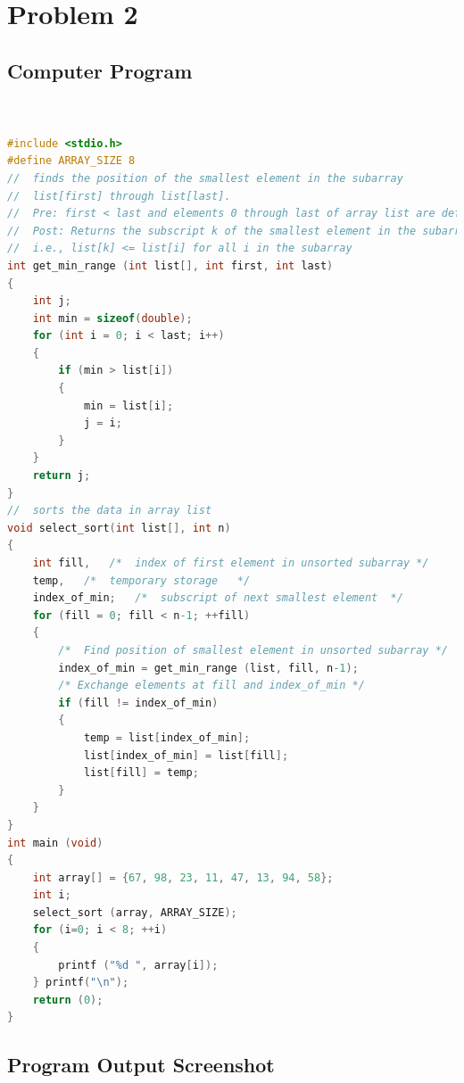 \section{{Problem 2}}
	
		\subsection{{Computer Program}}
	
			\begin{lstlisting}[language=C, caption=\textit{Program to calculate the Gross Pay of a series of workers}]	


#include <stdio.h>
#define ARRAY_SIZE 8
//  finds the position of the smallest element in the subarray
//  list[first] through list[last].
//  Pre: first < last and elements 0 through last of array list are defined.
//  Post: Returns the subscript k of the smallest element in the subarray;
//  i.e., list[k] <= list[i] for all i in the subarray
int get_min_range (int list[], int first, int last)
{
    int j;
    int min = sizeof(double);
    for (int i = 0; i < last; i++)
    {
        if (min > list[i])
        {
            min = list[i];
            j = i;
        }
    }
    return j;
}
//  sorts the data in array list
void select_sort(int list[], int n)
{
    int fill,   /*  index of first element in unsorted subarray */
    temp,   /*  temporary storage   */
    index_of_min;   /*  subscript of next smallest element  */
    for (fill = 0; fill < n-1; ++fill)
    {
        /*  Find position of smallest element in unsorted subarray */
        index_of_min = get_min_range (list, fill, n-1);
        /* Exchange elements at fill and index_of_min */
        if (fill != index_of_min)
        {
            temp = list[index_of_min];
            list[index_of_min] = list[fill];
            list[fill] = temp;
        }
    }
}
int main (void)
{
    int array[] = {67, 98, 23, 11, 47, 13, 94, 58};
    int i;
    select_sort (array, ARRAY_SIZE);
    for (i=0; i < 8; ++i)
    {
        printf ("%d ", array[i]);
    } printf("\n");
    return (0);
}

	\end{lstlisting}

		\subsection{{Program Output Screenshot}}
			
			{}
			
